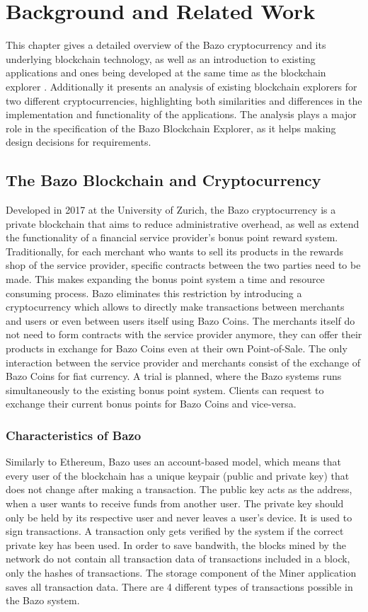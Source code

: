 \chapter{Background and Related Work}
This chapter gives a detailed overview of the Bazo cryptocurrency and its underlying blockchain technology, as well as an introduction to existing applications and ones being developed at the same time as the blockchain explorer . Additionally it presents an analysis of existing blockchain explorers for two different cryptocurrencies, highlighting both similarities and differences in the implementation and functionality of the applications. The analysis plays a major role in the specification of the Bazo Blockchain Explorer, as it helps making design decisions for requirements.

\section{The Bazo Blockchain and Cryptocurrency}
Developed in 2017 at the University of Zurich, the Bazo cryptocurrency is a private blockchain that aims to reduce administrative overhead, as well as extend the functionality of a financial service provider's bonus point reward system. Traditionally, for each merchant who wants to sell its products in the rewards shop of the service provider, specific contracts between the two parties need to be made. This makes expanding the bonus point system a time and resource consuming process. Bazo eliminates this restriction by introducing a cryptocurrency which allows to directly make transactions between merchants and users or even between users itself using Bazo Coins. The merchants itself do not need to form contracts with the service provider anymore, they can offer their products in exchange for Bazo Coins even at their own Point-of-Sale. The only interaction between the service provider and merchants consist of the exchange of Bazo Coins for fiat currency. A trial is planned, where the Bazo systems runs simultaneously to the existing bonus point system. Clients can request to exchange their current bonus points for Bazo Coins and vice-versa.

\subsection{Characteristics of Bazo}
Similarly to Ethereum, Bazo uses an account-based model, which means that every user of the blockchain has a unique keypair (public and private key) that does not change after making a transaction. The public key acts as the address, when a user wants to receive funds from another user. The private key should only be held by its respective user and never leaves a user's device. It is used to sign transactions. A transaction only gets verified by the system if the correct private key has been used. In order to save bandwith, the blocks mined by the network do not contain all transaction data of transactions included in a block, only the hashes of transactions. The storage component of the Miner application saves all transaction data. There are 4 different types of transactions possible in the Bazo system.

